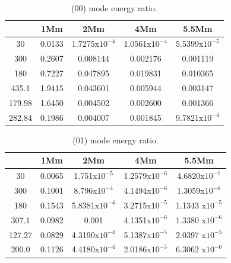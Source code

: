 \documentclass[authoryear,final,1p]{elsarticle}
\begin{document}
\begin{table}
\centering
\begin{tabular}{c c c c c }
\hline
   &  1Mm & 2Mm & 4Mm & 5.5Mm \\
\hline
30 &  0.0133 & 1.7275x$10^{-4}$ & 1.0561x$10^{-4}$ & 5.5399x$10^{-5}$ \\
\hline
300 & 0.2607 & 0.008144 & 0.002176 &  0.001119 \\
\hline
180 & 0.7227 & 0.047895 & 0.019831 &  0.010365 \\
\hline
435.1 & 1.9415 & 0.043601 & 0.005944 & 0.003147  \\
\hline
179.98 & 1.6450 & 0.004502 & 0.002600&  0.001366 \\ 
\hline
282.84 & 0.1986 & 0.004007 & 0.001845 &  9.7821x$10^{-4}$ \\
\hline
\end{tabular} 
\caption{ (00) mode energy ratio.}
\end{table}




\begin{table}
\centering
\begin{tabular}{c c c c c }
\hline
   &  1Mm & 2Mm & 4Mm & 5.5Mm \\
\hline
30 &  0.0065 & 1.751x$10^{-5}$ &  1.2579x$10^{-6}$ & 4.6820x$10^{-7}$ \\
\hline
300 & 0.1001 & 8.796x$10^{-4}$ &  4.1494x$10^{-6}$ &  1.3059x$10^{-6}$ \\
\hline
180 & 0.1543 &  5.8381x$10^{-4}$ &  3.2715x$10^{-5}$ &  1.1343 x$10^{-5}$ \\
\hline
307.1 & 0.0982 & 0.001 & 4.1351x$10^{-6}$ & 1.3380 x$10^{-6}$  \\
\hline
127.27 & 0.0829 &  4.3190x$10^{-4}$ &  5.1387x$10^{-5}$ & 2.0397 x$10^{-5}$ \\ 
\hline
200.0 & 0.1126 &  4.4180x$10^{-4}$ &  2.0186x$10^{-5}$ & 6.3062 x$10^{-6}$ \\
\hline
\end{tabular} 
\caption{ (01) mode energy ratio.}
\end{table}
\end{document}
